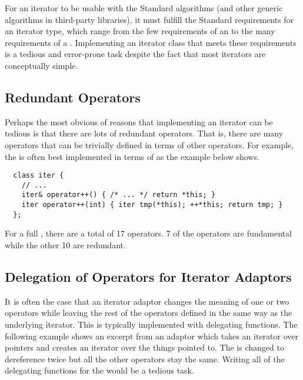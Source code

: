 \documentclass{netobjectdays}
\begin{document}
For an iterator to be usable with the Standard algorithms (and other
generic algorithms in third-party libraries), it must fulfill the
Standard requirements for an iterator type, which range from the few
requirements of an  to the many requirements
of a . Implementing an iterator class
that meets these requirements is a tedious and error-prone task
despite the fact that most iterators are conceptually simple.

\subsection{Redundant Operators}

Perhaps the most obvious of reasons that implementing an iterator can
be tedious is that there are lots of redundant operators.  That is,
there are many operators that can be trivially defined in terms of
other operators. For example, the  is often best
implemented in terms of  as the example below
shows.

{\footnotesize
\begin{verbatim}
  class iter {
    // ...
    iter& operator++() { /* ... */ return *this; }
    iter operator++(int) { iter tmp(*this); ++*this; return tmp; }
  };
\end{verbatim}
}

For a full , there are a total of 17
operators. 7 of the operators are fundamental while the other 10 are
redundant.

 


\subsection{Delegation of Operators for Iterator Adaptors}

It is often the case that an iterator adaptor changes the meaning of
one or two operators while leaving the rest of the operators defined
in the same way as the underlying iterator.  This is typically
implemented with delegating functions. The following example shows an
excerpt from an  adaptor which takes an
iterator over pointers and creates an iterator over the things pointed
to. The  is changed to dereference twice but all the
other operators stay the same. Writing all of the delegating functions
for the  would be a tedious task.
\end{document}
